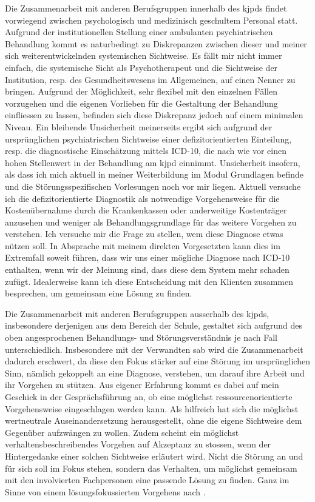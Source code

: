 
Die Zusammenarbeit mit anderen Berufsgruppen innerhalb des \ac{kjpd}s findet vorwiegend zwischen psychologisch und medizinisch geschultem Personal statt. Aufgrund der institutionellen Stellung einer ambulanten psychiatrischen Behandlung kommt es naturbedingt zu Diskrepanzen zwischen dieser und meiner sich weiterentwickelnden systemischen Sichtweise. Es fällt mir nicht immer einfach, die systemische Sicht als Psychotherapeut und die Sichtweise der Institution, resp. des Gesundheitswesens im Allgemeinen, auf einen Nenner zu bringen. Aufgrund der Möglichkeit, sehr flexibel mit den einzelnen Fällen vorzugehen und die eigenen Vorlieben für die Gestaltung der Behandlung einfliessen zu lassen, befinden sich diese Diskrepanz jedoch auf einem minimalen Niveau. Ein bleibende  Unsicherheit meinerseits ergibt sich aufgrund der ursprünglichen psychiatrischen Sichtweise einer defizitorientierten Einteilung, resp. die diagnostische Einschätzung mittels  ICD-10, die nach wie vor einen hohen Stellenwert in der Behandlung am \ac{kjpd} einnimmt. Unsicherheit insofern, als dass ich mich aktuell in meiner Weiterbildung im Modul Grundlagen befinde und die Störungsspezifischen Vorlesungen noch vor mir liegen. Aktuell versuche ich die defizitorientierte Diagnostik als notwendige Vorgehensweise für die Kostenübernahme durch die Krankenkassen oder anderweitige Kostenträger anzusehen und weniger als Behandlungsgrundlage für das weitere Vorgehen zu verstehen. Ich versuche mir die Frage zu stellen, wem diese Diagnose etwas nützen soll. In Absprache mit meinem direkten Vorgesetzten kann dies im Extremfall soweit führen, dass wir uns einer mögliche Diagnose nach ICD-10 enthalten, wenn wir der Meinung sind, dass diese dem System mehr schaden zufügt. Idealerweise kann ich diese Entscheidung mit den Klienten zusammen besprechen, um gemeinsam eine Lösung zu finden. 

Die Zusammenarbeit mit anderen Berufsgruppen ausserhalb des \ac{kjpd}s, insbesondere derjenigen aus dem Bereich der Schule, gestaltet sich aufgrund des oben angesprochenen Behandlungs- und Störungsverständnis je nach Fall unterschiedlich. Insbesondere mit der Verwandten \ac{sab} wird die Zusammenarbeit dadurch erschwert, da diese den Fokus stärker auf eine Störung im ursprünglichen Sinn, nämlich gekoppelt an eine Diagnose, verstehen, um darauf ihre Arbeit und ihr Vorgehen zu stützen. Aus eigener Erfahrung kommt es dabei auf mein Geschick in der Gesprächsführung an, ob eine möglichst ressourcenorientierte Vorgehensweise eingeschlagen werden kann. Als hilfreich hat sich die möglichst wertneutrale Auseinandersetzung herausgestellt, ohne die eigene Sichtweise dem Gegenüber aufzwängen zu wollen. Zudem scheint ein möglichst verhaltensbeschreibendes Vorgehen auf Akzeptanz zu stossen, wenn der Hintergedanke einer solchen Sichtweise erläutert wird. Nicht die Störung an und für sich soll im Fokus stehen, sondern das Verhalten, um möglichst gemeinsam mit den involvierten Fachpersonen eine passende Lösung zu finden. Ganz im Sinne von einem lösungsfokussierten Vorgehens nach . 
 
